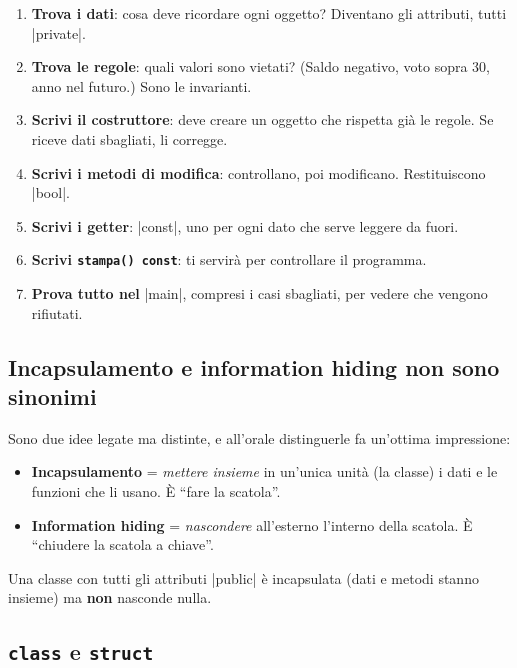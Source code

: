 \begin{passopasso}
\begin{enumerate}
  \item \textbf{Trova i dati}: cosa deve ricordare ogni oggetto? Diventano gli
        attributi, tutti \cc|private|.
  \item \textbf{Trova le regole}: quali valori sono vietati? (Saldo negativo,
        voto sopra 30, anno nel futuro.) Sono le invarianti.
  \item \textbf{Scrivi il costruttore}: deve creare un oggetto che rispetta già
        le regole. Se riceve dati sbagliati, li corregge.
  \item \textbf{Scrivi i metodi di modifica}: controllano, poi modificano.
        Restituiscono \cc|bool|.
  \item \textbf{Scrivi i getter}: \cc|const|, uno per ogni dato che serve leggere da fuori.
  \item \textbf{Scrivi \texttt{stampa() const}}: ti servirà per controllare il programma.
  \item \textbf{Prova tutto nel} \cc|main|, compresi i casi sbagliati, per
        vedere che vengono rifiutati.
\end{enumerate}
\end{passopasso}

\subsection*{Incapsulamento e information hiding non sono sinonimi}

Sono due idee legate ma distinte, e all'orale distinguerle fa un'ottima
impressione:
\begin{itemize}
  \item \textbf{Incapsulamento} = \emph{mettere insieme} in un'unica unità (la
        classe) i dati e le funzioni che li usano. È ``fare la scatola''.
  \item \textbf{Information hiding} = \emph{nascondere} all'esterno l'interno
        della scatola. È ``chiudere la scatola a chiave''.
\end{itemize}
Una classe con tutti gli attributi \cc|public| è incapsulata (dati e metodi
stanno insieme) ma \textbf{non} nasconde nulla.

\subsection*{\texttt{class} e \texttt{struct}}

